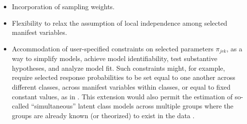\documentclass[letterpaper,12pt]{article}
\begin{document}
\begin{itemize}
    \item Incorporation of sampling weights.
    \item Flexibility to relax the assumption of local independence among selected manifest variables.
    \item Accommodation of user-specified constraints on selected parameters $\pi_{jrk}$, as a way to simplify models, achieve model identifiability, test substantive hypotheses, and analyze model fit. Such constraints might, for example, require selected response probabilities to be set equal to one another across different classes, across manifest variables within classes, or equal to fixed constant values, as in \citet{Goodman1974}.  This extension would also permit the estimation of so-called ``simultaneous'' latent class models across multiple groups where the groups are already known (or theorized) to exist in the data \citep{CloggGoodman1986}.
\end{itemize}

\newpage

\end{document}
